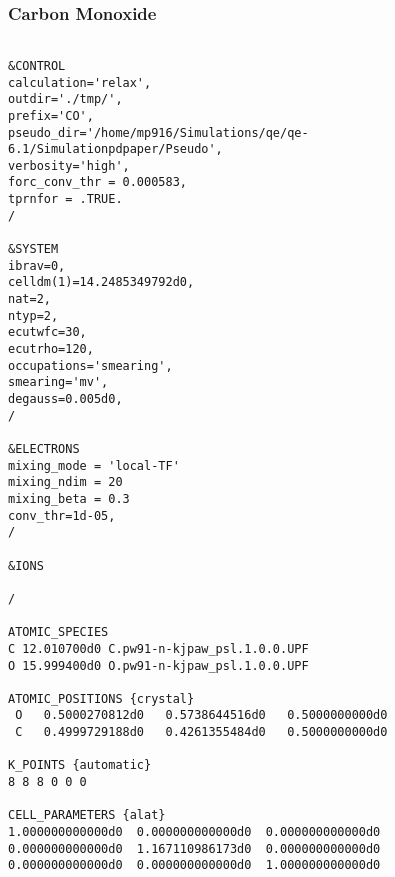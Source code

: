 \subsubsection*{Carbon Monoxide}
\begin{verbatim}
    
&CONTROL
calculation='relax',
outdir='./tmp/',
prefix='CO',
pseudo_dir='/home/mp916/Simulations/qe/qe-6.1/Simulationpdpaper/Pseudo',
verbosity='high',
forc_conv_thr = 0.000583,
tprnfor = .TRUE.
/

&SYSTEM
ibrav=0,
celldm(1)=14.2485349792d0,
nat=2,
ntyp=2,
ecutwfc=30,
ecutrho=120,
occupations='smearing',
smearing='mv',
degauss=0.005d0,
/

&ELECTRONS
mixing_mode = 'local-TF'
mixing_ndim = 20
mixing_beta = 0.3
conv_thr=1d-05,
/

&IONS

/

ATOMIC_SPECIES
C 12.010700d0 C.pw91-n-kjpaw_psl.1.0.0.UPF
O 15.999400d0 O.pw91-n-kjpaw_psl.1.0.0.UPF

ATOMIC_POSITIONS {crystal}
 O   0.5000270812d0   0.5738644516d0   0.5000000000d0
 C   0.4999729188d0   0.4261355484d0   0.5000000000d0

K_POINTS {automatic}
8 8 8 0 0 0

CELL_PARAMETERS {alat}
1.000000000000d0  0.000000000000d0  0.000000000000d0
0.000000000000d0  1.167110986173d0  0.000000000000d0
0.000000000000d0  0.000000000000d0  1.000000000000d0
\end{verbatim}

